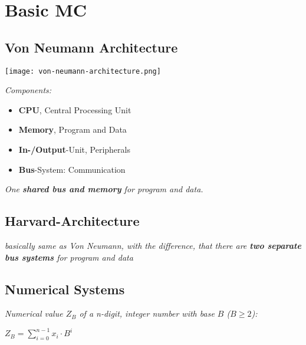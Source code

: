 \section{Basic MC}

\subsection{Von Neumann Architecture}

\texttt{[image: von-neumann-architecture.png]}

\textit{Components:}

\begin{itemize}
    \item{\textbf{CPU}, Central Processing Unit}
    \item{\textbf{Memory}, Program and Data}
    \item{\textbf{In-/Output}-Unit, Peripherals}
    \item{\textbf{Bus}-System: Communication}
\end{itemize}

\textit{One \textbf{shared bus and memory} for program and data.}

\subsection{Harvard-Architecture}

\textit{
    basically same as Von Neumann, with the difference, that
    there are \textbf{two separate bus systems} for program and data
}

\subsection{Numerical Systems}

\textit{
    Numerical value $Z_B$ of a n-digit, integer number with base $B$ ($B \geq 2$):
}

\begin{center}
    $Z_B = \sum^{n-1}_{i=0} x_i \cdot B^i$
\end{center}

